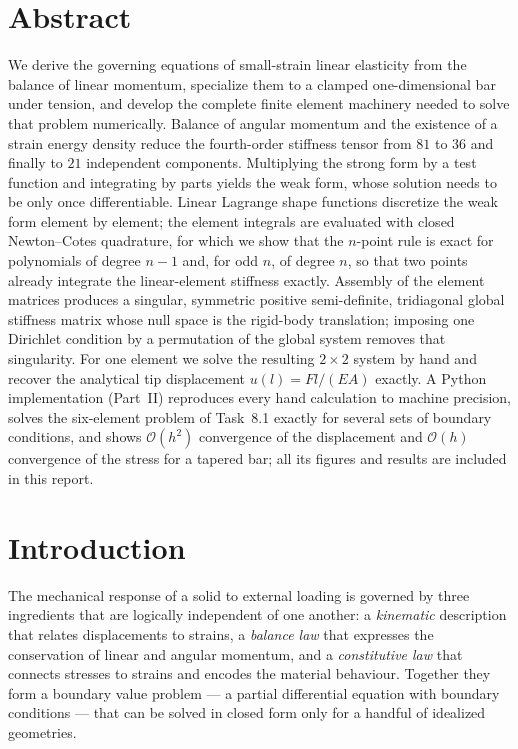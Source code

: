 \documentclass[11pt,a4paper]{article}
\numberwithin{equation}{section}
\theoremstyle{remark}
\newcommand{\bigO}[1]{\mathcal{O}\!\left(#1\right)}
\begin{document}
\section*{Abstract}
  We derive the governing equations of small-strain linear elasticity from the balance of
  linear momentum, specialize them to a clamped one-dimensional bar under tension, and
  develop the complete finite element machinery needed to solve that problem numerically.
  Balance of angular momentum and the existence of a strain energy density reduce the
  fourth-order stiffness tensor from $81$ to $36$ and finally to $21$ independent
  components. Multiplying the strong form by a test function and integrating by parts
  yields the weak form, whose solution needs to be only once differentiable. Linear
  Lagrange shape functions discretize the weak form element by element; the element
  integrals are evaluated with closed Newton--Cotes quadrature, for which we show that the
  $n$-point rule is exact for polynomials of degree $n-1$ and, for odd $n$, of degree $n$,
  so that two points already integrate the linear-element stiffness exactly. Assembly of
  the element matrices produces a singular, symmetric positive semi-definite, tridiagonal
  global stiffness matrix whose null space is the rigid-body translation; imposing one
  Dirichlet condition by a permutation of the global system removes that singularity. For
  one element we solve the resulting $2\times2$ system by hand and recover the analytical
  tip displacement $u(l) = Fl/(EA)$ exactly. A Python implementation (Part~II) reproduces every
  hand calculation to machine precision, solves the six-element problem of Task~8.1 exactly for
  several sets of boundary conditions, and shows $\bigO{h^2}$ convergence of the displacement and
  $\bigO{h}$ convergence of the stress for a tapered bar; all its figures and results are included
  in this report.

\tableofcontents
\clearpage

\section{Introduction}\label{sec:intro}

The mechanical response of a solid to external loading is governed by three ingredients
that are logically independent of one another: a \emph{kinematic} description that relates
displacements to strains, a \emph{balance law} that expresses the conservation of linear
and angular momentum, and a \emph{constitutive law} that connects stresses to strains and
encodes the material behaviour. Together they form a boundary value problem --- a partial
differential equation with boundary conditions --- that can be solved in closed form only
for a handful of idealized geometries.
\end{document}
